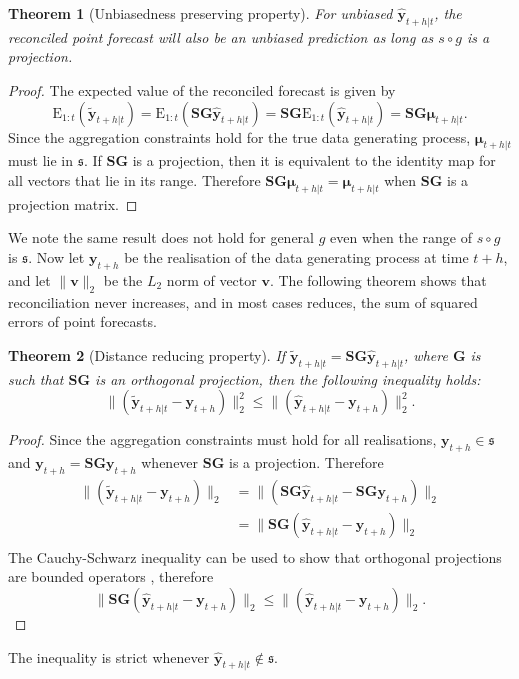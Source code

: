 \documentclass[a4paper, 11pt]{article}
\def\E{\text{E}}
\newtheorem{theo}{Theorem}[section]
\theoremstyle{definition}
\begin{document}
\begin{theo}[Unbiasedness preserving property]
  For unbiased $\hat{\bm{y}}_{t+h|t}$, the reconciled point forecast will also be an unbiased prediction as long as $s\circ g$ is a projection.
\end{theo}
\begin{proof}
	The expected value of the reconciled forecast is given by
	\[
  	\E_{1:t}(\tilde{\bm{y}}_{t+h|t})
	  = \E_{1:t}(\bm{S}\bm{G}\hat{\bm{y}}_{t+h|t})
  	= \bm{S}\bm{G}\E_{1:t}(\hat{\bm{y}}_{t+h|t})
    = \bm{S}\bm{G}\bm{\mu}_{t+h|t}.
	\]
	Since the aggregation constraints hold for the true data generating process, $\bm{\mu}_{t+h|t}$ must lie in $\mathfrak{s}$. If $\bm{S}\bm{G}$ is a projection, then it is equivalent to the identity map for all vectors that lie in its range. Therefore $\bm{S}\bm{G}\bm{\mu}_{t+h|t}=\bm{\mu}_{t+h|t}$ when $\bm{S}\bm{G}$ is a projection matrix.
\end{proof}
We note the same result does not hold for general $g$ even when the range of $s\circ g$ is $\mathfrak{s}$. Now let $\bm{y}_{t+h}$ be the realisation of the data generating process at time $t+h$, and let $\|\bm{v}\|_2$ be the $L_2$ norm of vector $\bm{v}$. The following theorem shows that reconciliation never increases, and in most cases reduces, the sum of squared errors of point forecasts.

\begin{theo}[Distance reducing property]
	If $\tilde{\bm{y}}_{t+h|t}=\bm{S}\bm{G}\hat{\bm{y}}_{t+h|t}$, where $\bm{G}$ is such that $\bm{S}\bm{G}$ is an orthogonal projection, then the following inequality holds:
	  \begin{equation}
	    \|(\tilde{\bm{y}}_{t+h|t}-\bm{y}_{t+h})\|^2_2\le\|(\hat{\bm{y}}_{t+h|t}-\bm{y}_{t+h})\|^2_2.
	  \end{equation}
\end{theo}
\begin{proof}
	Since the aggregation constraints must hold for all realisations, $\bm{y}_{t+h}\in\mathfrak{s}$ and $\bm{y}_{t+h}=\bm{S}\bm{G}\bm{y}_{t+h}$ whenever $\bm{S}\bm{G}$ is a projection. Therefore
	\begin{align}
	\|(\tilde{\bm{y}}_{t+h|t}-\bm{y}_{t+h})\|_2&=\|(\bm{S}\bm{G}\hat{\bm{y}}_{t+h|t}-\bm{S}\bm{G}\bm{y}_{t+h})\|_2\\
	&=\|\bm{S}\bm{G}(\hat{\bm{y}}_{t+h|t}-\bm{y}_{t+h})\|_2\\
	\end{align}
	The Cauchy-Schwarz inequality can be used to show that orthogonal projections are bounded operators \citep{Hun2001}, therefore
	 \begin{equation*}
	 \|\bm{S}\bm{G}(\hat{\bm{y}}_{t+h|t}-\bm{y}_{t+h})\|_2\le
	 \|(\hat{\bm{y}}_{t+h|t}-\bm{y}_{t+h})\|_2.
	 \end{equation*}
\end{proof}
The inequality is strict whenever $\hat{\bm{y}}_{t+h|t}\notin\mathfrak{s}$.
\end{document}
